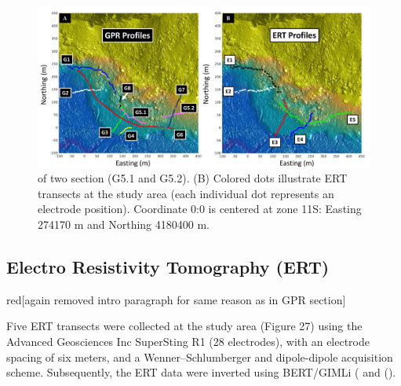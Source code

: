 \documentclass[5p]{elsarticle}
\newcommand{\alon}{\begin{color}{red}}
\newcommand{\aloff}{\end{color}}
\begin{document}
											\begin{figure}[h]

	\includegraphics[width=\textwidth]{Figures/GPR_ERT_Map.pdf}
		\caption{of two section (G5.1 and G5.2). (B) Colored dots illustrate ERT transects at the study area (each individual dot represents an electrode position). Coordinate 0:0 is centered at zone 11S: Easting 274170 m and Northing 4180400 m.  \label{GPR profile 7}}

											\end{figure}										
											
												
												
		\subsection{Electro Resistivity Tomography (ERT)}

                
\alon [again removed intro paragraph for same reason as in GPR section] \aloff

Five ERT transects were collected at the study area (Figure 27) using the Advanced Geosciences Inc SuperSting R1 (28 electrodes), with an electrode spacing of six meters, and a Wenner–Schlumberger and dipole-dipole acquisition scheme. Subsequently, the ERT data were inverted using BERT/GIMLi (\cite{gunther2006three} and (\cite{Ruecker2017}).

	
\end{document}
